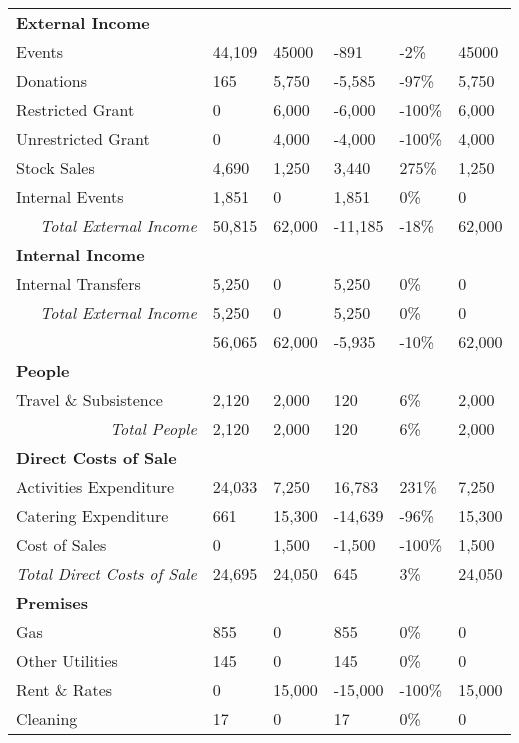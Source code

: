 {\begin{longtable}{p{} p{} p{} p{} p{} p{}}
    \multicolumn{6}{l}{\textbf{External Income}}\\*
    Events & 44,109 & 45000 & -891 & -2\% & 45000\\*
    Donations & 165 & 5,750 & -5,585 & -97\% & 5,750 \\*
    Restricted Grant & 0 & 6,000 & -6,000 & -100\% & 6,000 \\*
    Unrestricted Grant & 0 & 4,000 & -4,000 & -100\% & 4,000 \\*
    Stock Sales & 4,690 & 1,250 & 3,440 & 275\% & 1,250 \\*
    Internal Events & 1,851 & 0 & 1,851 & 0\% & 0\\*
    \multicolumn{1}{r}{\textit{Total External Income}} & 50,815 & 62,000 & -11,185 & -18\% & 62,000\\
    \hline
    \multicolumn{6}{l}{\textbf{Internal Income}}\\*
    Internal Transfers & 5,250 & 0 & 5,250 & 0\% & 0\\*
    \multicolumn{1}{r}{\textit{Total External Income}}& 5,250 & 0 & 5,250 & 0\% & 0\\*
    \hline
    \rowcolor{accent!60}
    \multicolumn{1}{r}{\textit{Total Income}}& 56,065 & 62,000 & -5,935 & -10\% & 62,000\\
    \hline
    \multicolumn{6}{l}{\textbf{People}}\\*
    Travel \& Subsistence & 2,120 & 2,000 & 120 & 6\% & 2,000\\*
    \multicolumn{1}{r}{\textit{Total People}} & 2,120 & 2,000 & 120 & 6\% & 2,000\\*
    \hline
    \multicolumn{6}{l}{\textbf{Direct Costs of Sale}}\\*
    Activities Expenditure & 24,033 & 7,250 & 16,783 & 231\% & 7,250 \\*
    Catering Expenditure & 661 & 15,300 & -14,639 & -96\% & 15,300 \\*
    Cost of Sales & 0 & 1,500 & -1,500 & -100\% & 1,500 \\*
    \multicolumn{1}{r}{\textit{Total Direct Costs of Sale}} & 24,695 & 24,050 & 645 & 3\% & 24,050 \\
    \hline
    \multicolumn{6}{l}{\textbf{Premises}}\\*
    Gas & 855 & 0 & 855 & 0\% & 0 \\*
    Other Utilities & 145 & 0 & 145 & 0\% & 0 \\*
    Rent \& Rates & 0 & 15,000 & -15,000 & -100\% & 15,000 \\*
    Cleaning & 17 & 0 & 17 & 0\% & 0 \\*

\end{longtable}}
